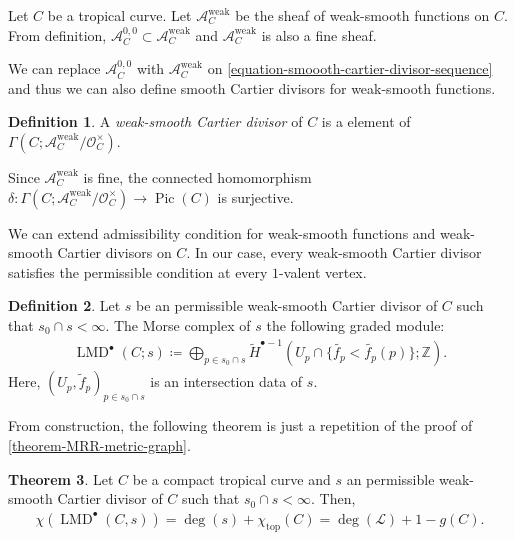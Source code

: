 \documentclass[a4paper,dvipdfmx,reqno,12pt]{amsart}
\theoremstyle{definition}
\newtheorem{theorem}{Theorem}[section]
\newtheorem{definition}[theorem]{Definition}
\newcommand{\deq}{\coloneqq}
\newcommand{\opn}[1]{\operatorname{#1}}
\numberwithin{equation}{section}
\begin{document}
Let $C$ be a tropical curve. 
Let $\mathcal{A}_C^{\opn{weak}}$ be the sheaf 
of weak-smooth functions on $C$. From definition,
$\mathcal{A}_C^{0,0}\subset \mathcal{A}_C^{\opn{weak}}$
and $\mathcal{A}_C^{\opn{weak}}$ is also a fine sheaf.

We can replace $\mathcal{A}_C^{0,0}$ with 
$\mathcal{A}_C^{\opn{weak}}$
on \cref{equation-smoooth-cartier-divisor-sequence}
and thus we can also define smooth Cartier divisors
for weak-smooth functions. 
\begin{definition}
A \emph{weak-smooth Cartier divisor} of $C$ is a 
element of $\Gamma(C;\mathcal{A}_C^{\opn{weak}}/
\mathcal{O}^{\times}_C)$.
\end{definition}

Since $\mathcal{A}_C^{\opn{weak}}$ is fine, 
the connected homomorphism 
$\delta\colon \Gamma(C;\mathcal{A}_C^{\opn{weak}}/
\mathcal{O}^{\times}_C)\to \opn{Pic}(C)$ is 
surjective.


We can extend admissibility condition for
weak-smooth functions and weak-smooth Cartier 
divisors on $C$. In our case, every weak-smooth 
Cartier divisor satisfies the permissible condition 
at every $1$-valent vertex.
\begin{definition}
Let $s$ be an permissible weak-smooth Cartier divisor 
of $C$ such that $s_0\cap s<\infty$.
The Morse complex of $s$ the following graded module:
\begin{align}
  \opn{LMD}^{\bullet}(C;s)\deq \bigoplus_{p\in s_0\cap s} 
\tilde{H}^{\bullet-1}
(U_p\cap \{\tilde{f_p}<\tilde{f_p}(p)\};\mathbb{Z}).
\end{align}
Here, $(U_p,\tilde{f}_p)_{p\in s_0\cap s}$ is an
intersection data of $s$.
\end{definition}

From construction, the following theorem is just a
repetition of the proof of 
\cref{theorem-MRR-metric-graph}.

\begin{theorem} \label{theorem-MRR-tropical-curve}
Let $C$ be a compact tropical curve and 
$s$ an permissible weak-smooth Cartier divisor 
of $C$ such that $s_0\cap s<\infty$. Then,
\begin{align}
  \chi(\opn{LMD}^{\bullet}(C,s))=\opn{deg}(s)+
\chi_{\opn{top}}(C)=\opn{deg}(\mathcal{L})+1-g(C).
\end{align}
\end{theorem}
\end{document}
